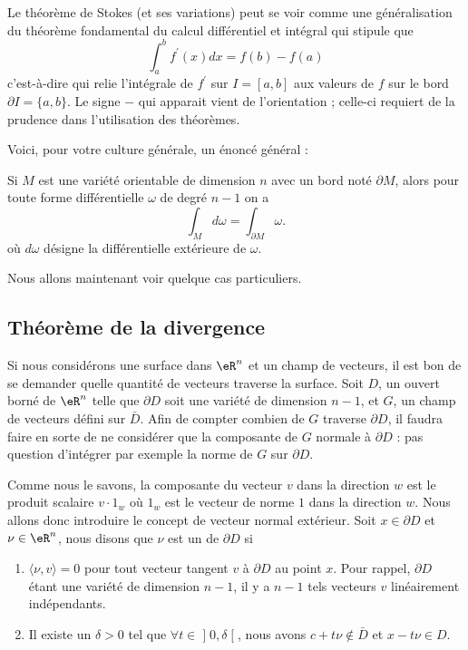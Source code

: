 Le théorème de Stokes (et ses variations) peut se voir comme une généralisation du théorème fondamental du calcul différentiel et intégral qui stipule que
\begin{equation*}
	\int_a^b f^\prime(x) d x = f(b) - f(a)
\end{equation*}
c'est-à-dire qui relie l'intégrale de $f^\prime$ sur $I = [a,b]$ aux valeurs de $f$ sur le bord $\partial I = \{a,b\}$. Le signe $-$ qui apparait vient de l'orientation ; celle-ci requiert de la prudence dans l'utilisation des théorèmes.

Voici, pour votre culture générale, un énoncé général :
\begin{theorem}
	Si $M$ est une variété orientable de dimension $n$ avec un bord noté $\partial  M$, alors pour toute forme différentielle $\omega$ de degré $n-1$ on a 
	\begin{equation*}
		\int_{ M} d \omega = \int_{\partial  M} \omega.
	\end{equation*}
	où $d \omega$ désigne la différentielle extérieure de $\omega$.
\end{theorem}
Nous allons maintenant voir quelque cas particuliers. 


\subsection{Théorème de la divergence}

Si nous considérons une surface dans $\eR^n$ et un champ de vecteurs, il est bon de se demander quelle \og quantité de vecteurs\fg{} traverse la surface. Soit $D$, un ouvert borné de $\eR^n$ telle que $\partial D$ soit une variété de dimension $n-1$, et $G$, un champ de vecteurs défini sur $\bar D$. Afin de compter combien de $G$ traverse $\partial D$, il faudra faire en sorte de ne considérer que la composante de $G$ normale à $\partial D$ : pas question d'intégrer par exemple la norme de $G$ sur $\partial D$.

Comme nous le savons, la composante du vecteur $v$ dans la direction $w$ est le produit scalaire $v\cdot 1_w$ où $1_w$ est le vecteur de norme $1$ dans la direction $w$. Nous allons donc introduire le concept de vecteur normal extérieur. Soit $x\in\partial D$ et $\nu\in\eR^n$, nous disons que $\nu$ est un  de $\partial D$ si
\begin{enumerate}

	\item
		$\langle \nu, v\rangle =0$ pour tout vecteur tangent $v$ à $\partial D$ au point $x$. Pour rappel, $\partial D$ étant une variété de dimension $n-1$, il y a $n-1$ tels vecteurs $v$ linéairement indépendants.
	
	\item
		Il existe un $\delta>0$ tel que $\forall t\in\mathopen] 0 , \delta \mathclose[$, nous avons $c+t\nu\notin \bar D$ et $x-t\nu\in D$.
 
\end{enumerate}

